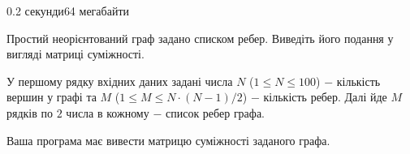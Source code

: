 \begin{problem}{}{}{}{0.2 секунди}{64 мегабайти}

Простий неорієнтований граф задано списком ребер. Виведіть його подання у вигляді матриці суміжності.

\InputFile
У першому рядку вхідних даних задані числа $N$ ($1 \le N \le 100$) $-$ кількість вершин у графі та 
$M$ ($1 \le M \le N\cdot(N-1)/2$) $-$ кількість ребер.
Далі йде $M$ рядків по $2$ числа в кожному $-$ список ребер графа. 

\OutputFile
Ваша програма має вивести матрицю суміжності заданого графа.

\Example

\begin{example}
%
\end{example}

\end{problem}

